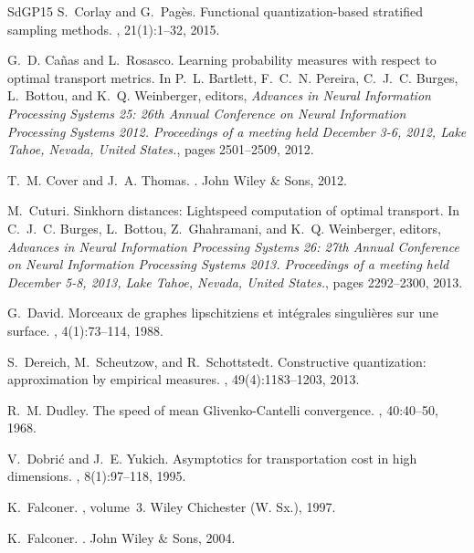 \documentclass[sts]{imsart}
\begin{document}
\begin{thebibliography}{SdGP{\etalchar{+}}15}
S.~Corlay and G.~Pag\`es.
\newblock Functional quantization-based stratified sampling methods.
, 21(1):1--32, 2015.

G.~D. Ca{\~{n}}as and L.~Rosasco.
\newblock Learning probability measures with respect to optimal transport
  metrics.
\newblock In P.~L. Bartlett, F.~C.~N. Pereira, C.~J.~C. Burges, L.~Bottou, and
  K.~Q. Weinberger, editors, {\em Advances in Neural Information Processing
  Systems 25: 26th Annual Conference on Neural Information Processing Systems
  2012. Proceedings of a meeting held December 3-6, 2012, Lake Tahoe, Nevada,
  United States.}, pages 2501--2509, 2012.

T.~M. Cover and J.~A. Thomas.
.
\newblock John Wiley \& Sons, 2012.

M.~Cuturi.
\newblock Sinkhorn distances: Lightspeed computation of optimal transport.
\newblock In C.~J.~C. Burges, L.~Bottou, Z.~Ghahramani, and K.~Q. Weinberger,
  editors, {\em Advances in Neural Information Processing Systems 26: 27th
  Annual Conference on Neural Information Processing Systems 2013. Proceedings
  of a meeting held December 5-8, 2013, Lake Tahoe, Nevada, United States.},
  pages 2292--2300, 2013.

G.~David.
\newblock Morceaux de graphes lipschitziens et int\'egrales singuli\`eres sur
  une surface.
, 4(1):73--114, 1988.

S.~Dereich, M.~Scheutzow, and R.~Schottstedt.
\newblock Constructive quantization: approximation by empirical measures.
, 49(4):1183--1203,
  2013.

R.~M. Dudley.
\newblock The speed of mean {G}livenko-{C}antelli convergence.
, 40:40--50, 1968.

V.~Dobri\'c and J.~E. Yukich.
\newblock Asymptotics for transportation cost in high dimensions.
, 8(1):97--118, 1995.

K.~Falconer.
, volume~3.
\newblock Wiley Chichester (W. Sx.), 1997.

K.~Falconer.
.
\newblock John Wiley \& Sons, 2004.


\end{thebibliography}
\end{document}
